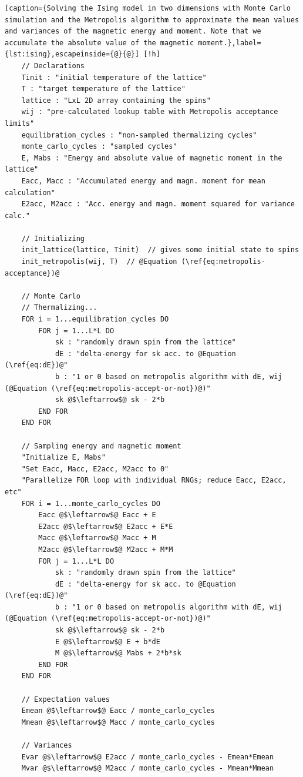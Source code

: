 \documentclass[]{article}
\begin{document}
\begin{lstlisting}[caption={Solving the Ising model in two dimensions with Monte Carlo simulation and the Metropolis algorithm to approximate the mean values and variances of the magnetic energy and moment. Note that we accumulate the absolute value of the magnetic moment.},label={lst:ising},escapeinside={@}{@}] [!h]
	// Declarations
	Tinit : "initial temperature of the lattice"
	T : "target temperature of the lattice"	
	lattice : "LxL 2D array containing the spins"
	wij : "pre-calculated lookup table with Metropolis acceptance limits"
	equilibration_cycles : "non-sampled thermalizing cycles"
	monte_carlo_cycles : "sampled cycles"
	E, Mabs : "Energy and absolute value of magnetic moment in the lattice"
	Eacc, Macc : "Accumulated energy and magn. moment for mean calculation"
	E2acc, M2acc : "Acc. energy and magn. moment squared for variance calc."
	
	// Initializing
	init_lattice(lattice, Tinit)  // gives some initial state to spins
	init_metropolis(wij, T)  // @Equation (\ref{eq:metropolis-acceptance})@
	
	// Monte Carlo
	// Thermalizing...
	FOR i = 1...equilibration_cycles DO
		FOR j = 1...L*L DO
			sk : "randomly drawn spin from the lattice"
			dE : "delta-energy for sk acc. to @Equation (\ref{eq:dE})@"
			b : "1 or 0 based on metropolis algorithm with dE, wij (@Equation (\ref{eq:metropolis-accept-or-not})@)"
			sk @$\leftarrow$@ sk - 2*b
		END FOR
	END FOR
	
	// Sampling energy and magnetic moment
	"Initialize E, Mabs"
	"Set Eacc, Macc, E2acc, M2acc to 0"
	"Parallelize FOR loop with individual RNGs; reduce Eacc, E2acc, etc"
	FOR i = 1...monte_carlo_cycles DO
		Eacc @$\leftarrow$@ Eacc + E
		E2acc @$\leftarrow$@ E2acc + E*E
		Macc @$\leftarrow$@ Macc + M
		M2acc @$\leftarrow$@ M2acc + M*M		
		FOR j = 1...L*L DO
			sk : "randomly drawn spin from the lattice"
			dE : "delta-energy for sk acc. to @Equation (\ref{eq:dE})@"
			b : "1 or 0 based on metropolis algorithm with dE, wij (@Equation (\ref{eq:metropolis-accept-or-not})@)"
			sk @$\leftarrow$@ sk - 2*b
			E @$\leftarrow$@ E + b*dE
			M @$\leftarrow$@ Mabs + 2*b*sk
		END FOR
	END FOR	
	
	// Expectation values
	Emean @$\leftarrow$@ Eacc / monte_carlo_cycles
	Mmean @$\leftarrow$@ Macc / monte_carlo_cycles

	// Variances
	Evar @$\leftarrow$@ E2acc / monte_carlo_cycles - Emean*Emean
	Mvar @$\leftarrow$@ M2acc / monte_carlo_cycles - Mmean*Mmean	
\end{lstlisting}
\end{document}
